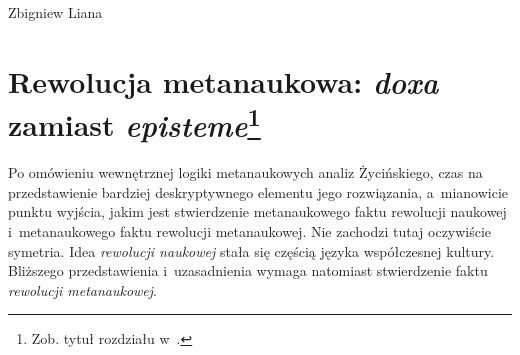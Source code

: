 \begin{artplenv}{Zbigniew Liana}
\section[Rewolucja metanaukowa: \textit{doxa} zamiast \textit{episteme}]{Rewolucja metanaukowa: \textit{doxa} zamiast \textit{episteme}\footnote{Zob. tytuł rozdziału w~\parencite[s.~101]{zycinski_jezyk_1983}.
	}
}

Po omówieniu wewnętrznej logiki metanaukowych analiz Życińskiego, czas na przedstawienie bardziej deskryptywnego elementu
jego rozwiązania, a~mianowicie punktu wyjścia, jakim jest stwierdzenie metanaukowego faktu rewolucji naukowej i~metanaukowego
faktu rewolucji metanaukowej. Nie zachodzi tutaj oczywiście symetria. Idea \textit{rewolucji naukowej}
stała się częścią języka współczesnej kultury. Bliższego przedstawienia i~uzasadnienia wymaga natomiast stwierdzenie
faktu \textit{rewolucji metanaukowej}. 


\end{artplenv}

